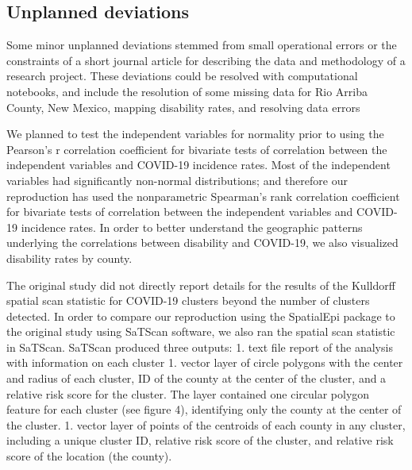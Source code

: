 \documentclass[
]{article}
\begin{document}
\hypertarget{unplanned-deviations}{%
\subsection{Unplanned deviations}\label{unplanned-deviations}}

Some minor unplanned deviations stemmed from small operational errors or
the constraints of a short journal article for describing the data and
methodology of a research project. These deviations could be resolved
with computational notebooks, and include the resolution of some missing
data for Rio Arriba County, New Mexico, mapping disability rates, and
resolving data errors

We planned to test the independent variables for normality prior to
using the Pearson's r correlation coefficient for bivariate tests of
correlation between the independent variables and COVID-19 incidence
rates. Most of the independent variables had significantly non-normal
distributions; and therefore our reproduction has used the nonparametric
Spearman's rank correlation coefficient for bivariate tests of
correlation between the independent variables and COVID-19 incidence
rates. In order to better understand the geographic patterns underlying
the correlations between disability and COVID-19, we also visualized
disability rates by county.

The original study did not directly report details for the results of
the Kulldorff spatial scan statistic for COVID-19 clusters beyond the
number of clusters detected. In order to compare our reproduction using
the SpatialEpi package to the original study using SaTScan software, we
also ran the spatial scan statistic in SaTScan. SaTScan produced three
outputs: 1. text file report of the analysis with information on each
cluster 1. vector layer of circle polygons with the center and radius of
each cluster, ID of the county at the center of the cluster, and a
relative risk score for the cluster. The layer contained one circular
polygon feature for each cluster (see figure 4), identifying only the
county at the center of the cluster. 1. vector layer of points of the
centroids of each county in any cluster, including a unique cluster ID,
relative risk score of the cluster, and relative risk score of the
location (the county).
\end{document}
